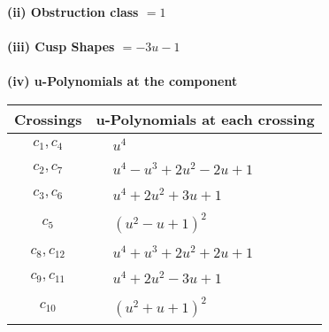 \documentclass[1p]{elsarticle_modified}
\theoremstyle{definition}
\begin{document}
\flushleft \textbf{(ii) Obstruction class $= 1$}\\~\\
\flushleft \textbf{(iii) Cusp Shapes $= -3 u-1$}\\~\\
\newpage\renewcommand{\arraystretch}{1}
\flushleft \textbf{(iv) u-Polynomials at the component}\newline \\
\begin{tabular}{m{50pt}|m{274pt}}
Crossings & \hspace{64pt}u-Polynomials at each crossing \\
\hline $$\begin{aligned}c_{1},c_{4}\end{aligned}$$&$\begin{aligned}
&u^4
\end{aligned}$\\
\hline $$\begin{aligned}c_{2},c_{7}\end{aligned}$$&$\begin{aligned}
&u^4- u^3+2 u^2-2 u+1
\end{aligned}$\\
\hline $$\begin{aligned}c_{3},c_{6}\end{aligned}$$&$\begin{aligned}
&u^4+2 u^2+3 u+1
\end{aligned}$\\
\hline $$\begin{aligned}c_{5}\end{aligned}$$&$\begin{aligned}
&(u^2- u+1)^2
\end{aligned}$\\
\hline $$\begin{aligned}c_{8},c_{12}\end{aligned}$$&$\begin{aligned}
&u^4+u^3+2 u^2+2 u+1
\end{aligned}$\\
\hline $$\begin{aligned}c_{9},c_{11}\end{aligned}$$&$\begin{aligned}
&u^4+2 u^2-3 u+1
\end{aligned}$\\
\hline $$\begin{aligned}c_{10}\end{aligned}$$&$\begin{aligned}
&(u^2+u+1)^2
\end{aligned}$\\
\hline
\end{tabular}\\~\\
\end{document}
